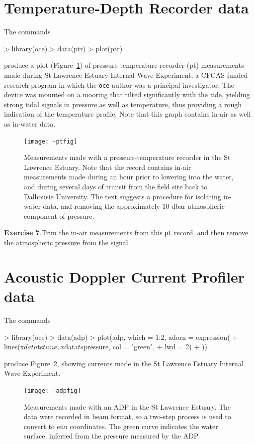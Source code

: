 \documentclass{article}
\newcommand{\workedexercise}[2]{
	\vspace{2ex plus 2ex minus 1ex}
	\begin{boxedminipage}[c]{0.95\linewidth}
		{\textbf{Exercise #1}.\hspace{1em}#2}
	\end{boxedminipage}
	\vspace{2ex plus 2ex minus 1ex}
}
\begin{document}
\section{Temperature-Depth Recorder data}
The commands
\begin{Schunk}
\begin{Sinput}
> library(oce)
> data(ptr)
> plot(ptr)
\end{Sinput}
\end{Schunk}
produce a plot (Figure~\ref{fig:pt}) of pressure-temperature recorder (pt)
measurements made during St Lawrence Estuary Internal Wave Experiment, a
CFCAS-funded research program in which the \texttt{oce} author was a principal
investigator.  The device was mounted on a mooring that tilted significantly
with the tide, yielding strong tidal signals in pressure as well as temperature,
thus providing a rough indication of the temperature profile.  Note that this
graph contains in-air as well as in-water data.
\begin{figure}
\begin{center}
\texttt{[image: -ptfig]}
\end{center}
\caption{Measurements made with a pressure-temperature recorder in the
  St Lawrence Estuary.  Note that the record contains in-air
  measurements made during an hour prior to lowering into the water,
  and during several days of transit from the field site back to
  Dalhousie University.  The text suggests a procedure for isolating
  in-water data, and removing the approximately 10 dbar atmospheric
  component of pressure.}
\label{fig:pt}
\end{figure}

\workedexercise{7}{Trim the in-air measurements from this \texttt{pt} record, and
then remove the atmospheric pressure from the signal.}


\section{Acoustic Doppler Current Profiler data}
The commands
\begin{Schunk}
\begin{Sinput}
> library(oce)
> data(adp)
> plot(adp, which = 1:2, adorn = expression({
+     lines(x$data$ts$time, x$data$ts$pressure, col = "green", 
+         lwd = 2)
+ }))
\end{Sinput}
\end{Schunk}
produce Figure~\ref{fig:adp}, showing currents made
in the St Lawrence Estuary Internal Wave Experiment.
\begin{figure}
\begin{center}
\texttt{[image: -adpfig]}
\end{center}
\caption{Measurements made with an ADP in the
  St Lawrence Estuary.  The data were recorded in beam format, so a two-step
  process is used to convert to enu coordinates.  The green curve indicates
  the water surface, inferred from the pressure measured by the ADP.}
\label{fig:adp}
\end{figure}
\end{document}
